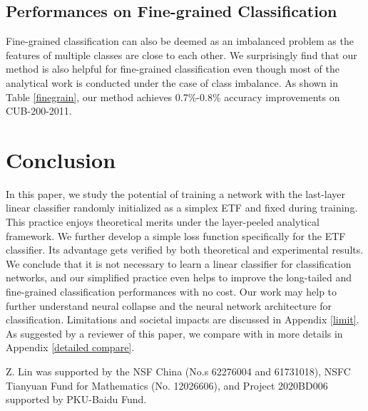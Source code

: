 \documentclass{article}
\newcommand{\<}{\left\langle}
\renewcommand{\>}{\right\rangle}
\begin{document}
\subsection{Performances on Fine-grained Classification}
\vspace{-1mm}

Fine-grained classification can also be deemed as an imbalanced problem as the features of multiple classes are close to each other. We surprisingly find that our method is also helpful for fine-grained classification even though most of the analytical work is conducted under the case of class imbalance. As shown in Table \ref{finegrain}, our method achieves 0.7\%-0.8\% accuracy improvements on CUB-200-2011.







\vspace{-2mm}
\section{Conclusion}
\vspace{-1mm}

In this paper, we study the potential of training a network with the last-layer linear classifier randomly initialized as a simplex ETF and fixed during training. This practice enjoys theoretical merits under the layer-peeled analytical framework. We further develop a simple loss function specifically for the ETF classifier. Its advantage gets verified by both theoretical and experimental results. We conclude that it is not necessary to learn a linear classifier for classification networks, and our simplified practice even helps to improve the long-tailed and fine-grained classification performances with no cost. Our work may help to further understand neural collapse and the neural network architecture for classification. Limitations and societal impacts are discussed in Appendix \ref{limit}. As suggested by a reviewer of this paper, we compare with \cite{fang2021exploring,pernici2021regular,zhu2021geometric} in more details in Appendix \ref{detailed compare}. 






\begin{ack}
	Z. Lin was supported by the NSF China (No.s 62276004 and 61731018), NSFC Tianyuan Fund for Mathematics (No. 12026606), and Project 2020BD006 supported by PKU-Baidu Fund.
\end{ack}
\end{document}
